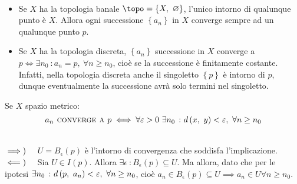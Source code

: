 \begin{examples}~{}
	\begin{itemize}
		\item Se $X$ ha la topologia banale $\topo=\left\{X,\ \emptyset\right\}$, l'unico intorno di qualunque punto è $X$. Allora ogni successione $\left\{a_n\right\}$ in $X$ converge sempre ad un qualunque punto $p$.
		\item Se $X$ ha la topologia discreta, $\left\{a_n\right\}$ successione in $X$ converge a $p\iff \exists n_0\ \colon a_n=p,\ \forall n\geq n_0$, cioè se la successione è finitamente costante. Infatti, nella topologia discreta anche il singoletto $\left\{p\right\}$ è intorno di $p$, dunque eventualmente la successione avrà solo termini nel singoletto.
	\end{itemize}
\end{examples}
\begin{observe}
Se $X$ spazio metrico:
\begin{equation}
	a_n\textsc{ converge a } p\iff \forall \varepsilon>0\ \exists n_0\ \colon d\left(x,\ y\right)<\varepsilon,\ \forall n\geq n_0
\end{equation}
\vspace{-6mm}
\end{observe}
\begin{demonstration}~{}\\
	$\implies)\quad$ $U=B_{\epsilon}\left(p\right)$ è l'intorno di convergenza che soddisfa l'implicazione.\\
	$\impliedby)\quad$ Sia $U\in I\left(p\right)$. Allora $\exists \epsilon\ \colon B_{\epsilon}\left(p\right)\subseteq U$. Ma allora, dato che per le ipotesi $\exists n_0\ \colon d\left(p,\ a_n\right)<\varepsilon,\ \forall n\geq n_0$, cioè $a_n\in B_{\epsilon}\left(p\right)\subseteq U\implies a_n\in U\forall n\geq n_0$.
\end{demonstration}
